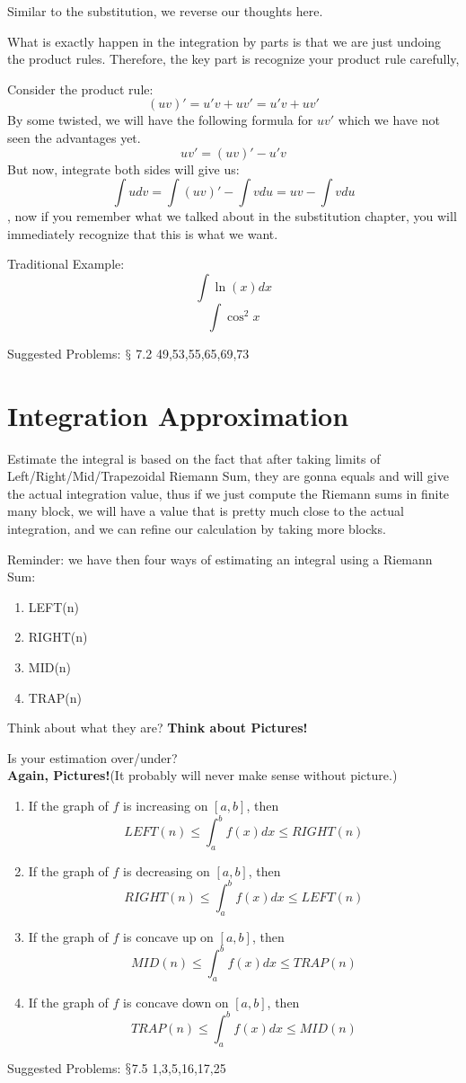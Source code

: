 \documentclass[12pt]{article}
\theoremstyle{definition}
\theoremstyle{definition}
\theoremstyle{remark}
\theoremstyle{definition}
\theoremstyle{definition}
\theoremstyle{definition}
\begin{document}
Similar to the substitution, we reverse our thoughts here.

What is exactly happen in the integration by parts is that we are just undoing the product rules. Therefore, the key part is recognize your product rule carefully, 

Consider the product rule:
\[(uv)'=u'v+uv'=u'v+uv' \]
By some twisted, we will have the following formula for $uv'$ which we have not seen the advantages yet.
\[uv'=(uv)'−u'v\]
But now, integrate both sides will give us:
\[\int udv=\int(uv)′−\int vdu= uv - \int v du\], now if you remember what we talked about in the substitution chapter, you will immediately recognize that this is what we want.

Traditional Example:\[\int \ln(x) dx\] \[\int \cos^2 x\]

Suggested Problems: $\mathsection$ 7.2 49,53,55,65,69,73

\newpage

\section{Integration Approximation}

Estimate the integral is based on the fact that after taking limits of Left/Right/Mid/Trapezoidal Riemann Sum, they are gonna equals and will give the actual integration value, thus if we just compute the Riemann sums in finite many block, we will have a value that is pretty much close to the actual integration, and we can refine our calculation by taking more blocks.

Reminder: we have then four ways of estimating an integral using a Riemann Sum:
\begin{enumerate}
\item LEFT(n)
\item RIGHT(n)
\item MID(n)
\item TRAP(n)
\end{enumerate}
Think about what they are?
\textbf{Think about Pictures!}

Is your estimation over/under?\\

\textbf{Again, Pictures!}(It probably will never make sense without picture.)
\begin{enumerate}
\item If the graph of $f$ is increasing on $[a,b]$, then $$LEFT(n)\leq \int^b_a f(x) dx \leq RIGHT(n)$$
\item If the graph of $f$ is decreasing on $[a,b]$, then $$RIGHT(n)\leq \int^b_a f(x) dx \leq LEFT(n)$$
\item If the graph of $f$ is concave up on $[a,b]$, then $$MID(n)\leq \int^b_a f(x) dx \leq TRAP(n)$$
\item If the graph of $f$ is concave down on $[a,b]$, then $$TRAP(n)\leq \int^b_a f(x) dx \leq MID(n)$$

\end{enumerate}

Suggested Problems: $\mathsection$7.5	1,3,5,16,17,25
\end{document}
